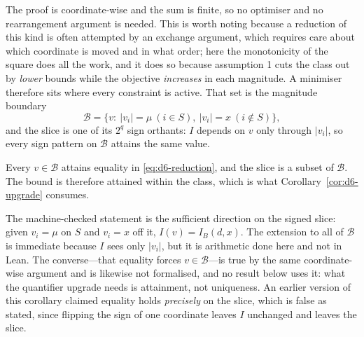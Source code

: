 The proof is coordinate-wise and the sum is finite, so no optimiser and no rearrangement
argument is needed. This is worth noting because a reduction of this kind is often attempted
by an exchange argument, which requires care about which coordinate is moved and in what
order; here the monotonicity of the square does all the work, and it does so because
assumption 1 cuts the class out by \emph{lower} bounds while the objective \emph{increases}
in each magnitude. A minimiser therefore sits where every constraint is active. That set is the magnitude
boundary
\begin{equation}
\mathcal{B}=\{v:\ |v_{i}|=\mu\ (i\in S),\ |v_{i}|=x\ (i\notin S)\},
\label{eq:d6-boundary}
\end{equation}
and the slice is one of its $2^{q}$ sign orthants: $I$ depends on $v$ only through
$|v_{i}|$, so every sign pattern on $\mathcal{B}$ attains the same value.

\begin{corollary}
\label{cor:d6-tight}
Every $v\in\mathcal{B}$ attains equality in \eqref{eq:d6-reduction}, and the slice is a subset
of $\mathcal{B}$. The bound is therefore attained within the class, which is what
Corollary~\ref{cor:d6-upgrade} consumes.
\end{corollary}


The machine-checked statement is the sufficient direction on the signed slice: given
$v_{i}=\mu$ on $S$ and $v_{i}=x$ off it, $I(v)=I_{B}(d,x)$. The extension to all of
$\mathcal{B}$ is immediate because $I$ sees only $|v_{i}|$, but it is arithmetic done here
and not in Lean. The converse---that equality forces $v\in\mathcal{B}$---is true by the same
coordinate-wise argument and is likewise not formalised, and no result below uses it: what
the quantifier upgrade needs is attainment, not uniqueness. An earlier version of this
corollary claimed equality holds \emph{precisely} on the slice, which is false as stated,
since flipping the sign of one coordinate leaves $I$ unchanged and leaves the slice.

